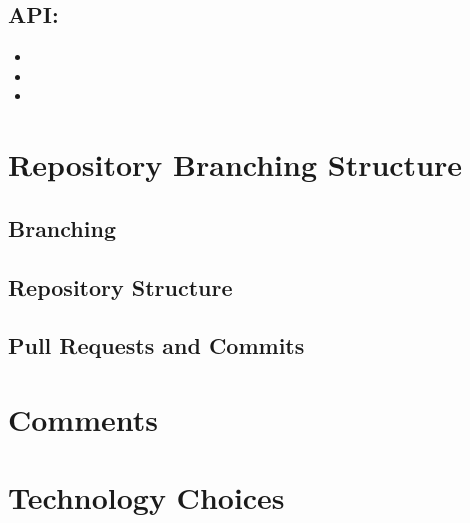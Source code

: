\documentclass[hidelinks, 12pt, a4paper]{article}
\begin{document}
        \subsection{\large{\textbf{API:}}}
        \begin{itemize}[]
            \item  
            \item  
            \item 
        \end{itemize}
        
\newpage
        
\section{Repository Branching Structure}
\subsection{Branching}
\vspace{0.5cm} 

\subsection{Repository Structure}
\vspace{0.5cm} 

\subsection{Pull Requests and Commits}
\vspace{0.5cm} 

\newpage  

\section{Comments}
\newpage

\section{Technology Choices}
\end{document}
